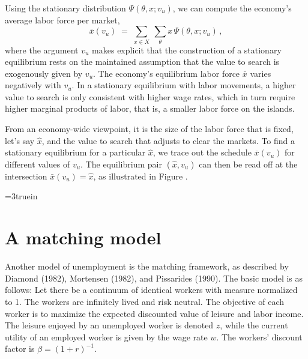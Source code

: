 Using the stationary distribution $\Psi(\theta,x;v_u)$, we can
compute the economy's average labor force per market,
$$
\bar x(v_u) \;=\; \sum_{x \in X}\ \sum_{\theta} x \, \Psi(\theta,x;v_u)\,,
$$
where the argument $v_u$ makes explicit that the construction
of a stationary equilibrium rests on the maintained assumption
that the value to search is exogenously given by $v_u$. The
economy's equilibrium labor force $\bar x$ varies negatively
with $v_u$. In a stationary equilibrium with labor
movements, a higher value to search is only consistent with
higher wage rates, which in turn require higher marginal
products of labor, that is, a smaller labor force on the islands.

From an economy-wide viewpoint, it is the size of the labor
force that is fixed, let's say $\hat x$, and the value to
search that adjusts to clear the markets. To find a
stationary equilibrium for a particular $\hat x$, we trace
out the schedule $\bar x(v_u)$ for different values of $v_u$.
The equilibrium pair $(\hat x, v_u)$ can then be read off at the
intersection $\bar x(v_u) = \hat x$, as illustrated in
Figure . %


\centerline{\epsfxsize=3truein}
\caption{The curve maps an economy's average labor force per market, $\bar x$,
into the stationary equilibrium value to search, $v_u$.}
\endfigure

\section{A matching model}\label{sec:matchingmodel}%
Another model of unemployment is the matching framework, as described
by Diamond (1982), Mortensen (1982), and Pissarides (1990).
%
The basic
model is as follows: Let there be a continuum of identical workers
with measure normalized to 1. The workers are infinitely lived and
risk neutral. The objective of each worker is to maximize the expected
discounted value of leisure and labor income. The leisure enjoyed by
an unemployed worker is denoted $z$, while the current utility of an
employed worker is given by the wage rate $w$. The workers'
discount factor is $\beta = (1+r)^{-1}$.

